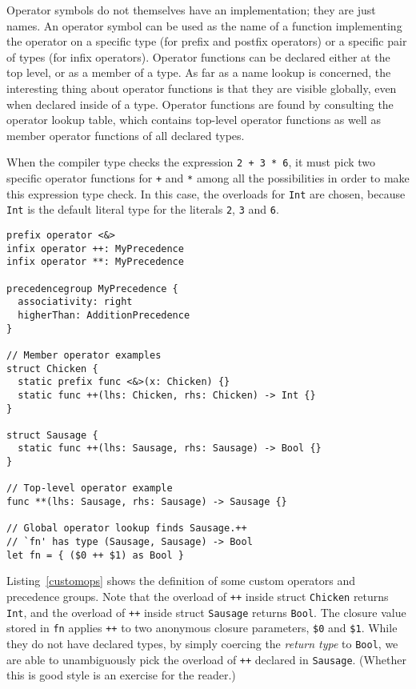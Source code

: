 \documentclass[a4paper,headsepline,bibliography=totoc,toc=flat,fleqn,twoside=semi]{scrbook}
\theoremstyle{definition}
\theoremstyle{definition}
\theoremstyle{definition}
\begin{document}
Operator symbols do not themselves have an implementation; they are just names. An operator symbol can be used as the name of a function implementing the operator on a specific type (for prefix and postfix operators) or a specific pair of types (for infix operators). Operator functions can be declared either at the top level, or as a member of a type. As far as a name lookup is concerned, the interesting thing about operator functions is that they are visible globally, even when declared inside of a type. Operator functions are found by consulting the operator lookup table, which contains top-level operator functions as well as member operator functions of all declared types.

When the compiler type checks the expression \texttt{2 + 3 * 6}, it must pick two specific operator functions for \texttt{+} and \texttt{*} among all the possibilities in order to make this expression type check. In this case, the overloads for \texttt{Int} are chosen, because \texttt{Int} is the default literal type for the literals \texttt{2}, \texttt{3} and \texttt{6}.

\begin{listing}\label{customops}
\begin{Verbatim}
prefix operator <&>
infix operator ++: MyPrecedence
infix operator **: MyPrecedence

precedencegroup MyPrecedence {
  associativity: right
  higherThan: AdditionPrecedence
}

// Member operator examples
struct Chicken {
  static prefix func <&>(x: Chicken) {}
  static func ++(lhs: Chicken, rhs: Chicken) -> Int {}
}

struct Sausage {
  static func ++(lhs: Sausage, rhs: Sausage) -> Bool {}
}

// Top-level operator example
func **(lhs: Sausage, rhs: Sausage) -> Sausage {}

// Global operator lookup finds Sausage.++
// `fn' has type (Sausage, Sausage) -> Bool
let fn = { ($0 ++ $1) as Bool }
\end{Verbatim}
\end{listing}
Listing~\ref{customops} shows the definition of some custom operators and precedence groups. Note that the overload of \texttt{++} inside struct \texttt{Chicken} returns \texttt{Int}, and the overload of \texttt{++} inside struct \texttt{Sausage} returns \texttt{Bool}. The closure value stored in \texttt{fn} applies \texttt{++} to two anonymous closure parameters, \verb|$0| and \verb|$1|. While they do not have declared types, by simply coercing the \emph{return type} to \texttt{Bool}, we are able to unambiguously pick the overload of \texttt{++} declared in \texttt{Sausage}. (Whether this is good style is an exercise for the reader.)
\end{document}
